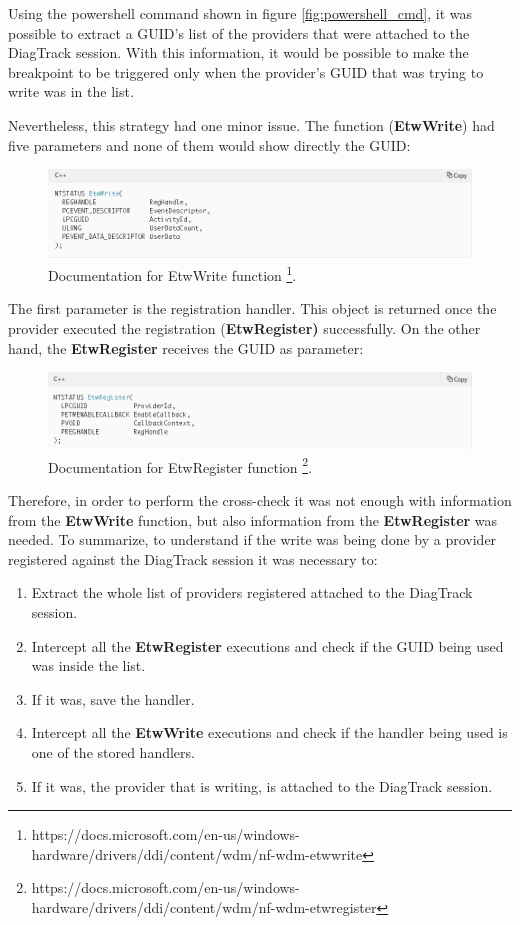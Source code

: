 Using the powershell command shown in figure \ref{fig:powershell_cmd}, it was possible to extract a GUID's list of the providers that were attached to the DiagTrack session. With this information, it would be possible to make the breakpoint to be triggered only when the provider's GUID that was trying to write was in the list. 

Nevertheless, this strategy had one minor issue. The function ({\bfseries EtwWrite}) had five parameters and none of them would show directly the GUID:

\begin{figure}[H]
  \includegraphics[width=\linewidth]{images/etw_write_docu.png}
  \caption[]{Documentation for EtwWrite function \footnote{https://docs.microsoft.com/en-us/windows-hardware/drivers/ddi/content/wdm/nf-wdm-etwwrite}. }
  \label{fig:etw_write_docu}
\end{figure}

The first parameter is the registration handler. This object is returned once the provider executed the registration ({\bfseries EtwRegister)} successfully.
On the other hand, the {\bfseries EtwRegister} receives the GUID as parameter:
\begin{figure}[H]
  \includegraphics[width=\linewidth]{images/etw_register_docu.png}
  \caption[]{Documentation for EtwRegister function \footnote{https://docs.microsoft.com/en-us/windows-hardware/drivers/ddi/content/wdm/nf-wdm-etwregister}.}
  \label{fig:etw_register_docu}
\end{figure}

Therefore, in order to perform the cross-check it was not enough with information from the {\bfseries EtwWrite} function, but also information from the {\bfseries EtwRegister} was needed. To summarize, to understand if the write was being done by a provider registered against the DiagTrack session it was necessary to: 
\begin{enumerate}
    \item Extract the whole list of providers registered attached to the DiagTrack session.
    \item Intercept all the {\bfseries EtwRegister} executions and check if the GUID being used was inside the list.
    \item If it was, save the handler. 
    \item Intercept all the {\bfseries EtwWrite} executions and check if the handler being used is one of the stored handlers.
    \item If it was, the provider that is writing, is attached to the DiagTrack session.
\end{enumerate}

